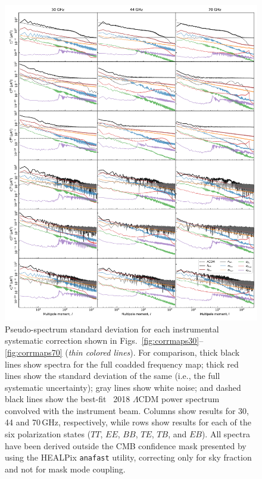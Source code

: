 \documentclass[twocolumn]{aa}
\begin{document}
\begin{figure}
  \center	
  \includegraphics[width=0.98\linewidth]{figs/components_power_spectrum_std_masked.pdf}
  \caption{Pseudo-spectrum standard deviation for each instrumental
    systematic correction shown in
    Figs.~\ref{fig:corrmaps30}--\ref{fig:corrmaps70} (\emph{thin
      colored lines}). For comparison, thick black lines show spectra
    for the full coadded frequency map; thick red lines show the
    standard deviation of the same (i.e., the full systematic
    uncertainty); gray lines show white noise; and dashed black lines
    show the best-fit \Planck\ 2018 $\Lambda$CDM power spectrum
    convolved with the instrument beam. Columns show results for 30,
    44 and 70\,GHz, respectively, while rows show results for each of
    the six polarization states ($TT$, $EE$, $BB$, $TE$, $TB$, and
    $EB$). All spectra have been derived outside the CMB confidence
    mask presented by \citet{bp13} using the HEALPix \texttt{anafast}
    utility, correcting only for sky fraction and not for mask mode
    coupling. }
  \label{fig:corrmap_powspec_stddev}
\end{figure}
\end{document}
